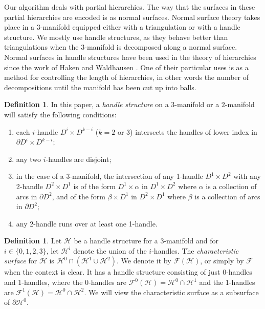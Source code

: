 \documentclass[oneside]{amsart}
\numberwithin{equation}{section}
\theoremstyle{plain}
\theoremstyle{definition}
\newtheorem{definition}[equation]{Definition}
\begin{document}
Our algorithm deals with partial hierarchies. The way that the surfaces in these partial hierarchies are encoded is as normal surfaces. Normal surface theory takes place in a 3-manifold equipped either with a triangulation or with a handle structure. We mostly use handle structures, as they behave better than triangulations when the 3-manifold is decomposed along a normal surface. Normal surfaces in handle structures have been used in the theory of hierarchies since the work of Haken \cite{Haken:Homeomorphism} and Waldhausen \cite{Waldhausen}. One of their particular uses is as a method for controlling the length of hierarchies, in other words the number of decompositions until the manifold has been cut up into balls.

\begin{definition}
\label{Def:HandleStructure}
In this paper, a \emph{handle structure} on a $3$-manifold or a $2$-manifold
will satisfy the following conditions:
\begin{enumerate}
\item each $i$-handle $D^i \times D^{k-i}$ ($k = 2$ or $3$) intersects the handles of lower index in $\partial D^i \times D^{k-i}$;
\item any two $i$-handles are disjoint;
\item in the case of a 3-manifold, the intersection of any 1-handle $D^1 \times D^2$ with any 2-handle $D^2 \times D^1$ is of the form $D^1 \times \alpha$ in $D^1 \times D^2$ where $\alpha$ is a collection of arcs in $\partial D^2$, and of the form $\beta \times D^1$ in $D^2 \times D^1$ where $\beta$ is a collection of arcs in $\partial D^2$;
\item any 2-handle runs over at least one 1-handle.
\end{enumerate}
\end{definition}


\begin{definition}
Let $\mathcal{H}$ be a handle structure for a 3-manifold and for $i \in \{ 0,1,2,3 \}$, let $\mathcal{H}^i$ denote the
union of the $i$-handles.
The \emph{characteristic surface} for $\mathcal{ H}$ is
$\mathcal{ H}^0 \cap (\mathcal{ H}^1 \cup \mathcal{ H}^2)$. We denote it by $\mathcal{ F}(\mathcal{ H})$, or simply by $\mathcal{F}$ when the context is clear.
It has a handle structure consisting of just 0-handles and 1-handles, where the 0-handles are
$\mathcal{ F}^0(\mathcal{ H})  = \mathcal{ H}^0 \cap \mathcal{ H}^1$ and the 1-handles are $\mathcal{ F}^1(\mathcal{ H}) = 
\mathcal{ H}^0 \cap \mathcal{ H}^2$. We will view the characteristic surface as a subsurface of $\partial \mathcal{ H}^0$.
\end{definition}
\end{document}
